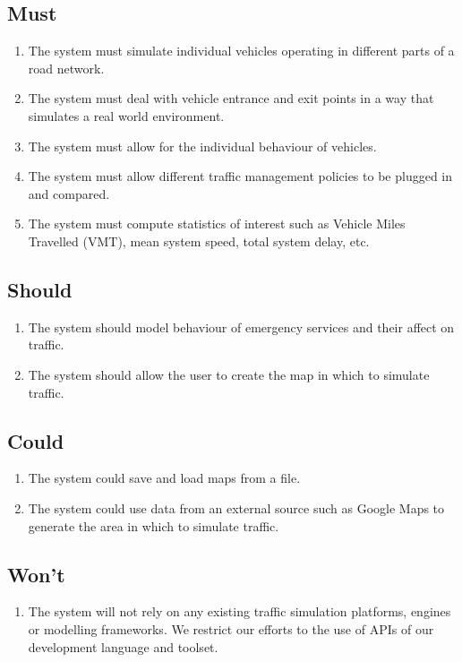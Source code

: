\documentclass[11pt,a4paper]{article}
\begin{document}
\subsection{Must}
\label{section:must}
\begin{enumerate}
  \item The system must simulate individual vehicles operating in different parts of a road network.
  \item The system must deal with vehicle entrance and exit points in a way that simulates a real world environment.
  \item The system must allow for the individual behaviour of vehicles.
  \item The system must allow different traffic management policies to be plugged in and compared.
  \item The system must compute statistics of interest such as Vehicle Miles Travelled (VMT), mean system speed, total system delay, etc. 
\end{enumerate}

\subsection{Should}
\begin{enumerate}
  \item The system should model behaviour of emergency services and their affect on traffic.
  \item The system should allow the user to create the map in which to simulate traffic.
\end{enumerate}

\subsection{Could}
\begin{enumerate}
  \item The system could save and load maps from a file.
  \item The system could use data from an external source such as Google Maps to generate the area in which to simulate traffic.
\end{enumerate}

\subsection{Won't}
\begin{enumerate}
  \item The system will not rely on any existing traffic simulation platforms, engines or modelling frameworks.  We restrict our efforts to the use of APIs of our development language and toolset.
\end{enumerate}
\end{document}
